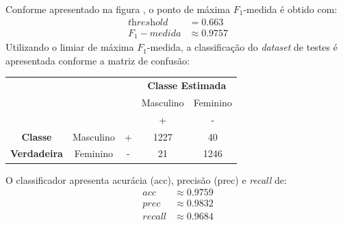\documentclass{article}
\begin{document}
    Conforme apresentado na figura , o ponto de máxima $F_1$-medida é
    obtido com:
    \begin{align*}
        \textit{threshold}&=0.663 \\
        F_1-medida&\approx0.9757
    \end{align*}
    Utilizando o limiar de máxima $F_1$-medida, a classificação do \textit{dataset} de testes é 
    apresentada conforme a matriz de confusão:
    \begin{table}[H]
        \begin{tabular}{ccccc}
        &  &  & \multicolumn{2}{c}{\textbf{Classe Estimada}} \\
        &  &  & Masculino & Feminino \\
        &  &  & + & - \\ \cline{4-5} 
        \textbf{Classe} & Masculino & \multicolumn{1}{c|}{+} & \multicolumn{1}{c|}{1227} & \multicolumn{1}{c|}{40} \\ \cline{4-5} 
        \textbf{Verdadeira} & Feminino & \multicolumn{1}{c|}{-} & \multicolumn{1}{c|}{21} & \multicolumn{1}{c|}{1246} \\ \cline{4-5} 
        \end{tabular}
    \end{table}
    O classificador apresenta acurácia (acc), precisão (prec) e \textit{recall} de:
    \begin{align*}
        acc & \approx0.9759 \\
        prec & \approx0.9832 \\
        recall & \approx0.9684
    \end{align*}
\end{document}
